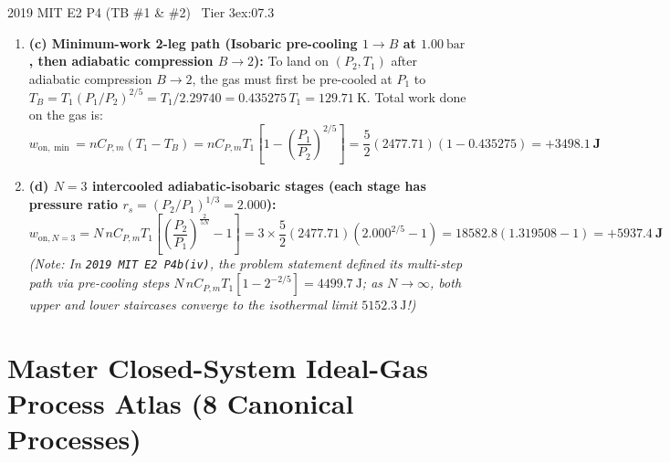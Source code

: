\begin{workedexample}{2019 MIT E2 P4 (TB \#1 \& \#2) \textbar\ Tier 3}{ex:07.3}
\begin{enumerate}
  Along adiabat $1\to A$, $T_A = T_1(P_2/P_1)^{(\gamma-1)/\gamma} = T_1(8.000)^{2/5} = 2.29740\,T_1 = \SI{684.62}{\kelvin}$. Since $\Delta U_{1\to 2} = 0$, the total work done on the gas across both legs equals the heat rejected during the isobaric cooling $A\to 2$, or directly:
  \[
    w_{\mathrm{on,\max}} = \underbrace{nC_{V,m}(T_A - T_1)}_{\text{adiabat } 1\to A} + \underbrace{nR(T_A - T_1)}_{\text{isobar } A\to 2} = nC_{P,m}T_1\left[\left(\frac{P_2}{P_1}\right)^{2/5} - 1\right] = \frac{5}{2}(2477.71)(2.29740 - 1) = \mathbf{+\SI{8036.4}{\joule}}
  \]
  \item \textbf{(c) Minimum-work 2-leg path (Isobaric pre-cooling $1\to B$ at $\SI{1.00}{\bar}$, then adiabatic compression $B\to 2$):}
  To land on $(P_2, T_1)$ after adiabatic compression $B\to 2$, the gas must first be pre-cooled at $P_1$ to $T_B = T_1(P_1/P_2)^{2/5} = T_1 / 2.29740 = 0.435275\,T_1 = \SI{129.71}{\kelvin}$. Total work done on the gas is:
  \[
    w_{\mathrm{on,\min}} = nC_{P,m}(T_1 - T_B) = nC_{P,m}T_1\left[1 - \left(\frac{P_1}{P_2}\right)^{2/5}\right] = \frac{5}{2}(2477.71)(1 - 0.435275) = \mathbf{+\SI{3498.1}{\joule}}
  \]
  \item \textbf{(d) $N=3$ intercooled adiabatic-isobaric stages (each stage has pressure ratio $r_s = (P_2/P_1)^{1/3} = 2.000$):}
  \[
    w_{\mathrm{on},N=3} = N\,nC_{P,m}T_1\left[\left(\frac{P_2}{P_1}\right)^{\frac{2}{5N}} - 1\right] = 3 \times \frac{5}{2}(2477.71)\left(2.000^{2/5} - 1\right) = 18582.8(1.319508 - 1) = \mathbf{+\SI{5937.4}{\joule}}
  \]
  \emph{(Note: In \texttt{2019 MIT E2 P4b(iv)}, the problem statement defined its multi-step path via pre-cooling steps $N\,nC_{P,m}T_1[1 - 2^{-2/5}] = \SI{4499.7}{\joule}$; as $N\to\infty$, both upper and lower staircases converge to the isothermal limit $\SI{5152.3}{\joule}$!)}
\end{enumerate}
\end{workedexample}

\section{Master Closed-System Ideal-Gas Process Atlas (8 Canonical Processes)}\label{sec:07.3}

